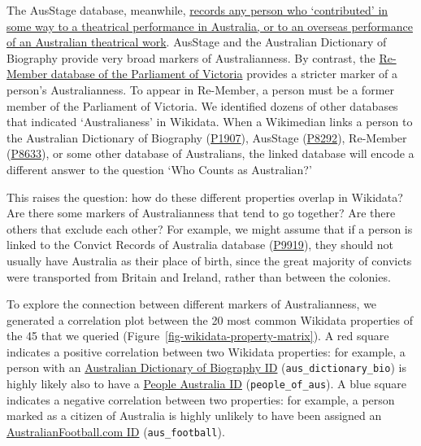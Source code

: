 \documentclass[
  a4paper,
  DIV=11,
  numbers=noendperiod]{scrreprt}
\begin{document}
The AusStage database, meanwhile,
\href{https://www.ausstage.edu.au/pages/learn/data-scope}{records any
person who `contributed' in some way to a theatrical performance in
Australia, or to an overseas performance of an Australian theatrical
work}. AusStage and the Australian Dictionary of Biography provide very
broad markers of Australianness. By contrast, the
\href{https://www.parliament.vic.gov.au/about/people-in-parliament/re-member/form/27}{Re-Member
database of the Parliament of Victoria} provides a stricter marker of a
person's Australianness. To appear in Re-Member, a person must be a
former member of the Parliament of Victoria. We identified dozens of
other databases that indicated `Australianess' in Wikidata. When a
Wikimedian links a person to the Australian Dictionary of Biography
(\href{https://www.wikidata.org/wiki/Property:P1907}{P1907}), AusStage
(\href{https://www.wikidata.org/wiki/Property:P8292}{P8292}), Re-Member
(\href{https://www.wikidata.org/wiki/Property:P8633}{P8633}), or some
other database of Australians, the linked database will encode a
different answer to the question `Who Counts as Australian?'

This raises the question: how do these different properties overlap in
Wikidata? Are there some markers of Australianness that tend to go
together? Are there others that exclude each other? For example, we
might assume that if a person is linked to the Convict Records of
Australia database
(\href{https://www.wikidata.org/wiki/Property:P9919}{P9919}), they
should not usually have Australia as their place of birth, since the
great majority of convicts were transported from Britain and Ireland,
rather than between the colonies.

To explore the connection between different markers of Australianness,
we generated a correlation plot between the 20 most common Wikidata
properties of the 45 that we queried
(Figure~\ref{fig-wikidata-property-matrix}). A red square indicates a
positive correlation between two Wikidata properties: for example, a
person with an
\href{https://www.wikidata.org/wiki/Property:P1907}{Australian
Dictionary of Biography ID} (\texttt{aus\_dictionary\_bio}) is highly
likely also to have a
\href{https://www.wikidata.org/wiki/Property:P9159}{People Australia ID}
(\texttt{people\_of\_aus}). A blue square indicates a negative
correlation between two properties: for example, a person marked as a
citizen of Australia is highly unlikely to have been assigned an
\href{https://www.wikidata.org/wiki/Property:P3546}{AustralianFootball.com
ID} (\texttt{aus\_football}).
\end{document}

